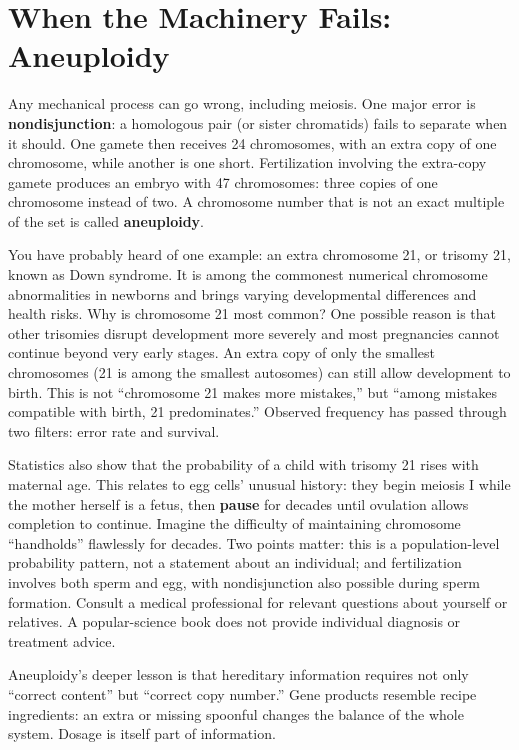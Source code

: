 \section{When the Machinery Fails: Aneuploidy}

Any mechanical process can go wrong, including meiosis. One major error is \textbf{nondisjunction}: a homologous pair (or sister chromatids) fails to separate when it should. One gamete then receives 24 chromosomes, with an extra copy of one chromosome, while another is one short. Fertilization involving the extra-copy gamete produces an embryo with 47 chromosomes: three copies of one chromosome instead of two. A chromosome number that is not an exact multiple of the set is called \textbf{aneuploidy}.

You have probably heard of one example: an extra chromosome 21, or trisomy 21, known as Down syndrome. It is among the commonest numerical chromosome abnormalities in newborns and brings varying developmental differences and health risks. Why is chromosome 21 most common? One possible reason is that other trisomies disrupt development more severely and most pregnancies cannot continue beyond very early stages. An extra copy of only the smallest chromosomes (21 is among the smallest autosomes) can still allow development to birth. This is not ``chromosome 21 makes more mistakes,'' but ``among mistakes compatible with birth, 21 predominates.'' Observed frequency has passed through two filters: error rate and survival.

Statistics also show that the probability of a child with trisomy 21 rises with maternal age. This relates to egg cells' unusual history: they begin meiosis I while the mother herself is a fetus, then \textbf{pause} for decades until ovulation allows completion to continue. Imagine the difficulty of maintaining chromosome ``handholds'' flawlessly for decades. Two points matter: this is a population-level probability pattern, not a statement about an individual; and fertilization involves both sperm and egg, with nondisjunction also possible during sperm formation. Consult a medical professional for relevant questions about yourself or relatives. A popular-science book does not provide individual diagnosis or treatment advice.

Aneuploidy's deeper lesson is that hereditary information requires not only ``correct content'' but ``correct copy number.'' Gene products resemble recipe ingredients: an extra or missing spoonful changes the balance of the whole system. Dosage is itself part of information.

